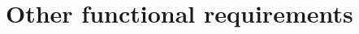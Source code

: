 \documentclass[Main]{subfiles}
\begin{document}
\chapter{Other functional requirements}




\end{document}
